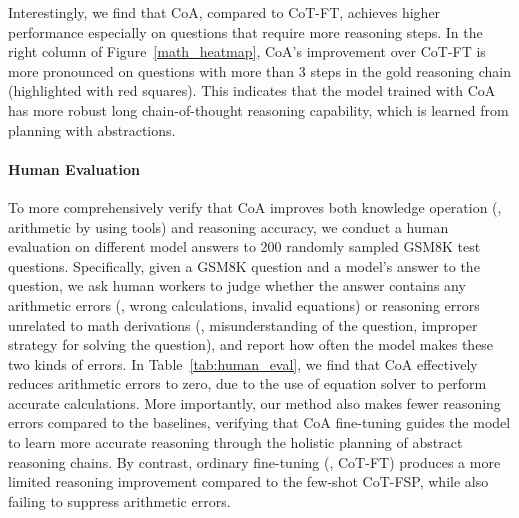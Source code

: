 \begin{table*}[t]
{\begin{tabular}{llcccccccc}
\bottomrule
\end{tabular}
}
\caption{Wiki QA evaluation results on LLaMa-2-Chat-based models. ``Both'' denotes the overall evaluation results on both bridge and comparison portions of HotpotQA. ``Time'' denotes the average seconds that each agent needs to answer a question in HotpotQA. Exact match rate to the final gold answer (\ie{}, accuracy) is reported.
For each base model, the best and second-best results are \textbf{bolded} and \underline{underlined}, respectively. The best results labeled with $^{\ast}$ are significantly better than their corresponding second-best results, with the significant test p-value $< 0.05$.
}
\label{tab:wiki_results}
\end{table*}

Interestingly, we find that CoA, compared to CoT-FT, achieves higher performance especially on questions that require more reasoning steps.
In the right column of Figure~\ref{math_heatmap}, CoA's improvement over CoT-FT is more pronounced on questions with more than $3$ steps in the gold reasoning chain (highlighted with red squares). 
This indicates that the model trained with CoA has more robust long chain-of-thought reasoning capability, which is learned from planning with abstractions.

\paragraph{Human Evaluation}
To more comprehensively verify that CoA improves both knowledge operation (\ie{}, arithmetic by using tools) and reasoning accuracy, we conduct a human evaluation on different model answers to 200 randomly sampled GSM8K test questions. 
Specifically, given a GSM8K question and a model's answer to the question, we ask human workers to judge whether the answer contains any arithmetic errors (\eg{}, wrong calculations, invalid equations) or reasoning errors unrelated to math derivations (\eg{}, misunderstanding of the question, improper strategy for solving the question), and report how often the model makes these two kinds of errors.
In Table~\ref{tab:human_eval}, we find that CoA effectively reduces arithmetic errors to zero, due to the use of equation solver to perform accurate calculations.
More importantly, our method also makes fewer reasoning errors compared to the baselines, verifying that CoA fine-tuning guides the model to learn more accurate reasoning through the holistic planning of abstract reasoning chains.
By contrast, ordinary fine-tuning (\ie, CoT-FT) produces a more limited reasoning improvement compared to the few-shot CoT-FSP, while also failing to suppress arithmetic errors.

